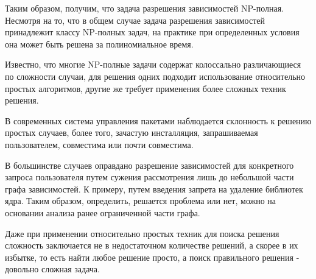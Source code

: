 Таким образом, получим, что задача разрешения зависимостей  NP-полная.\\

Несмотря на то, что в общем случае задача разрешения зависимостей принадлежит
классу NP-полных задач, на практике при определенных условия она может быть
решена за полиномиальное время. 

Известно, что многие NP-полные задачи содержат
колоссально различающиеся по сложности случаи, для решения одних подходит использование относительно простых алгоритмов, другие же требует применения более сложных 
техник решения.

В современных система управления пакетами наблюдается склонность к решению простых
случаев, более того, зачастую инсталляция, запрашиваемая пользователем, совместима или почти совместима. 

В большинстве случаев оправдано разрешение зависимостей для конкретного
запроса пользователя путем сужения рассмотрения лишь до небольшой части графа зависимостей\cite{apt_pbo}. 
К примеру, путем введения запрета на удаление библиотек ядра. Таким образом, определить,
решается проблема или нет, можно на основании анализа ранее ограниченной части графа.

Даже при применении относительно простых техник для поиска решения сложность заключается
не в недостаточном количестве решений, а скорее в их избытке, то есть найти любое решение
просто, а поиск правильного решения - довольно сложная задача.
 




